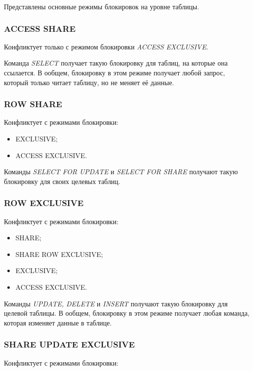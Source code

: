 Представлены основные режимы блокировок на уровне таблицы.

\subsubsection*{ACCESS SHARE}

Конфликтует только с режимом блокировки \textit{ACCESS EXCLUSIVE}.

Команда \textit{SELECT} получает такую блокировку для таблиц, на которые она ссылается. В ообщем, блокировку в этом режиме получает любой запрос, который только читает таблицу, но не меняет её данные.

\subsubsection*{ROW SHARE}

Конфликтует с режимами блокировки:

\begin{itemize}
	\item EXCLUSIVE;
	\item ACCESS  EXCLUSIVE.
\end{itemize}

Команды \textit{SELECT FOR UPDATE} и \textit{ SELECT FOR SHARE} получают такую блокировку для своих целевых таблиц.

\subsubsection*{ROW EXCLUSIVE}

Конфликтует с режимами блокировки:

\begin{itemize}
	\item SHARE;
	\item SHARE ROW EXCLUSIVE;
	\item EXCLUSIVE;
	\item ACCESS EXCLUSIVE.
\end{itemize}

Команды \textit{UPDATE, DELETE} и \textit{INSERT} получают такую блокировку для целевой таблицы. В ообщем, блокировку в этом режиме получает любая команда, которая изменяет данные в таблице.

\subsubsection*{SHARE UPDATE EXCLUSIVE}

Конфликтует с режимами блокировки:

